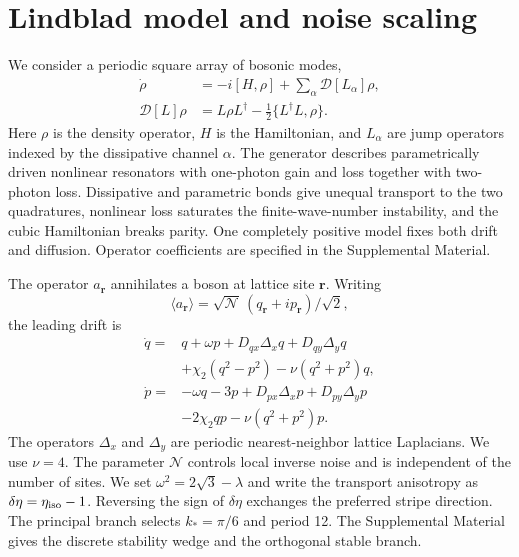 \documentclass[aps,prl,twocolumn,superscriptaddress,nofootinbib,floatfix]{revtex4-2}
\newcommand{\Diss}{\mathcal D}
\newcommand{\cN}{\mathcal N}
\begin{document}
\section{Lindblad model and noise scaling}
We consider a periodic square array of bosonic modes,
\begin{align}
 \dot\rho&=-i[H,\rho]+\sum_\alpha\Diss[L_\alpha]\rho,\nonumber\\
 \Diss[L]\rho&=L\rho L^\dagger-\tfrac12\{L^\dagger L,\rho\}.
 \label{eq:lindblad}
\end{align}
Here $\rho$ is the density operator, $H$ is the Hamiltonian, and $L_\alpha$ are jump operators indexed by the dissipative channel $\alpha$. The generator describes parametrically driven nonlinear resonators with one-photon gain and loss together with two-photon loss. Dissipative and parametric bonds give unequal transport to the two quadratures, nonlinear loss saturates the finite-wave-number instability, and the cubic Hamiltonian breaks parity. One completely positive model fixes both drift and diffusion. Operator coefficients are specified in the Supplemental Material.

The operator $a_{\bm r}$ annihilates a boson at lattice site $\bm r$. Writing
\begin{equation}
 \langle a_{\bm r}\rangle=\sqrt{\cN}\,(q_{\bm r}+ip_{\bm r})/\sqrt2,
 \label{eq:mean_scaling}
\end{equation}
the leading drift is
\begin{align}
 \dot q={}&q+\omega p+D_{qx}\Delta_xq+D_{qy}\Delta_yq\nonumber\\
 &+\chi_2(q^2-p^2)-\nu(q^2+p^2)q,\nonumber\\
 \dot p={}&-\omega q-3p+D_{px}\Delta_xp+D_{py}\Delta_yp\nonumber\\
 &-2\chi_2qp-\nu(q^2+p^2)p.
 \label{eq:qp}
\end{align}
The operators $\Delta_x$ and $\Delta_y$ are periodic nearest-neighbor lattice Laplacians. We use $\nu=4$. The parameter $\cN$ controls local inverse noise and is independent of the number of sites. We set $\omega^2=2\sqrt3-\lambda$ and write the transport anisotropy as $\delta\eta=\eta_{\rm iso}-1$. Reversing the sign of $\delta\eta$ exchanges the preferred stripe direction. The principal branch selects $k_*=\pi/6$ and period 12. The Supplemental Material gives the discrete stability wedge and the orthogonal stable branch.
\end{document}

